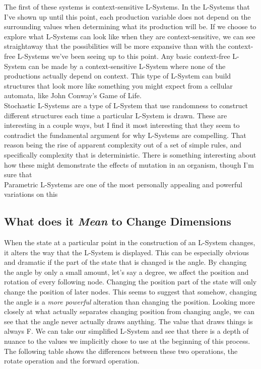 \documentclass[12pt,twoside]{reedthesis}
\begin{document}
	The first of these systems is context-sensitive L-Systems. In the L-Systems that I've shown up until this point, each production variable does not depend on the surrounding values when determining what its production will be. If we choose to explore what L-Systems can look like when they are context-sensitive, we can see straightaway that the possibilities will be more expansive than with the context-free L-Systems we've been seeing up to this point. Any basic context-free L-System can be made by a context-sensitive L-System where none of the productions actually depend on context. This type of L-System can build structures that look more like something you might expect from a cellular automata, like John Conway's Game of Life.\\
	
	Stochastic L-Systems are a type of L-System that use randomness to construct different structures each time a particular L-System is drawn. These are interesting in a couple ways, but I find it most interesting that they seem to contradict the fundamental argument for why L-Systems are compelling. That reason being the rise of apparent complexity out of a set of simple rules, and specifically complexity that is deterministic. There is something interesting about how these might demonstrate the effects of mutation in an organism, though I'm sure that\\
	
	Parametric L-Systems are one of the most personally appealing and powerful variations on this\\


\subsection{What does it \textit{Mean} to Change Dimensions}
When the state at a particular point in the construction of an L-System changes, it alters the way that the L-System is displayed. This can be especially obvious and dramatic if the part of the state that is changed is the angle. By changing the angle by only a small amount, let's say a degree, we affect the position and rotation of every following node. Changing the position part of the state will only change the position of later nodes. This seems to suggest that somehow, changing the angle is a \textit{more powerful} alteration than changing the position. Looking more closely at what actually separates changing position from changing angle, we can see that the angle never actually draws anything. The value that draws things is always F. We can take our simplified L-System and see that there is a depth of nuance to the values we implicitly chose to use at the beginning of this process. The following table shows the differences between these two operations, the rotate operation and the forward operation.\\
\end{document}
